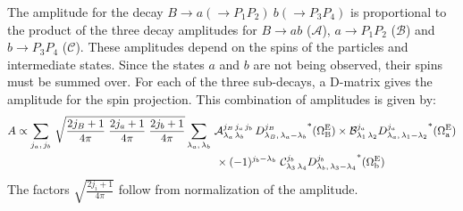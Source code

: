 The amplitude for the decay $B\to a(\to P_1P_2)\ b(\to P_3P_4)$ is proportional to the
product of the three decay amplitudes for $B\to ab$ ($\mathcal{A}$), $a\to P_1P_2$ ($\mathcal{B}$)
and $b\to P_3P_4$ ($\mathcal{C}$). These amplitudes depend on the spins of the particles and
intermediate states. Since the states $a$ and $b$ are not being observed, their spins must be
summed over. For each of the three sub-decays, a D-matrix gives the amplitude for the spin
projection. This combination of amplitudes is given by:
\begin{align}\label{eq:amplitude}
  A &\propto \sum_{j_a,\,j_b}\,
       \sqrt{\frac{2j_B+1}{4\pi}\; \frac{2j_{a}+1}{4\pi}\; \frac{2j_{b}+1}{4\pi}}
       \sum_{\lambda_a,\,\lambda_b}\,
       \mathcal{A}_{\lambda_a\,\lambda_b}^{j_B\,j_a\,j_b}\,
       {D_{\lambda_B,\,\lambda_a-\lambda_b}^{j_B}}^*(\EulSet[B])
       \times \mathcal{B}_{\lambda_1\,\lambda_2}^{j_a}
       {D_{\lambda_a,\,\lambda_1-\lambda_2}^{j_a}}^*(\EulSet[a])
       \nonumber\\&\qquad\qquad\qquad\qquad\qquad\qquad\qquad\qquad\qquad
       \times (-1)^{j_b-\lambda_b}\ \mathcal{C}_{\lambda_3\,\lambda_4}^{j_b}
       {D_{\lambda_b,\,\lambda_3-\lambda_4}^{j_b}}^*(\EulSet[b])
\end{align}
The factors $\sqrt{\frac{2j_i+1}{4\pi}}$ follow from normalization of the amplitude.

